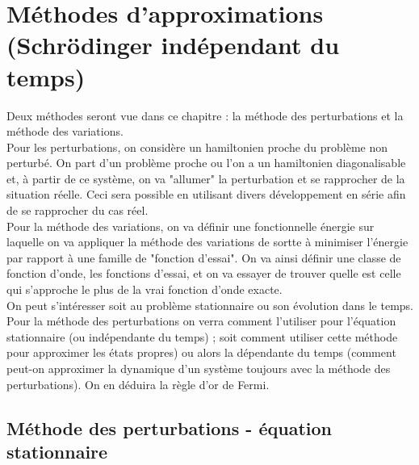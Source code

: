 \chapter{Méthodes d'approximations (Schrödinger indépendant du temps)}
Deux méthodes seront vue dans ce chapitre : la méthode des perturbations 
et la méthode des variations. \\

Pour les perturbations, on considère un hamiltonien proche du problème non perturbé. 
On part d'un problème proche ou l'on a un hamiltonien diagonalisable et, à partir de 
ce système, on va "allumer" la perturbation et se rapprocher de la situation réelle. 
Ceci sera possible en utilisant divers développement en série afin de se rapprocher 
du cas réel.\\

Pour la méthode des variations, on va définir une fonctionnelle énergie sur laquelle 
on va appliquer la méthode des variations de sortte à minimiser l'énergie par rapport 
à une famille de "fonction d'essai". On va ainsi définir une classe de fonction d'onde, 
les fonctions d'essai, et on va essayer de trouver quelle est celle qui s'approche le 
plus de la vrai fonction d'onde exacte. \\

On peut s'intéresser soit au problème stationnaire ou son évolution dans le temps. Pour 
la méthode des perturbations on verra comment l'utiliser pour l'équation stationnaire 
(ou indépendante du temps) ; soit comment utiliser cette méthode pour approximer les états 
propres) ou alors la dépendante du temps (comment peut-on approximer la dynamique d'un 
système toujours avec la méthode des perturbations). On en déduira la règle d'or de Fermi. 

\section{Méthode des perturbations - équation stationnaire}
